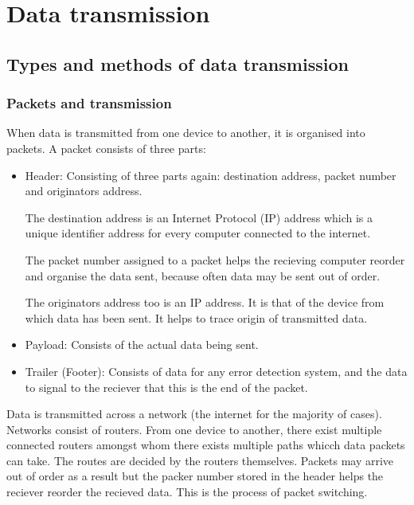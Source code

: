 \documentclass{article}
\begin{document}
\section{Data transmission}
\subsection{Types and methods of data transmission}
\subsubsection{Packets and transmission}
When data is transmitted from one device to another, it is organised into packets. A 
packet consists of three parts:
\begin{itemize}
	\item Header: Consisting of three parts again: destination address, packet number and
		originators address. 

		The destination address is an Internet Protocol (IP) address
		which is a unique identifier address for every computer connected to the internet.
		
		The packet number assigned to a packet helps the recieving computer reorder and
		organise the data sent, because often data may be sent out of order.

		The originators address too is an IP address. It is that of the device from which
		data has been sent. It helps to trace origin of transmitted data.
	\item Payload: Consists of the actual data being sent.
	\item Trailer (Footer): Consists of data for any error detection system, and the 
		data to signal to the reciever that this is the end of the packet.
\end{itemize}

Data is transmitted across a network (the internet for the majority of cases). Networks
consist of routers. From one device to another, there exist multiple connected routers
amongst whom there exists multiple paths whicch data packets can take. The routes are
decided by the routers themselves. Packets may arrive out of order as a result but the
packer number stored in the header helps the reciever reorder the recieved data. This is
the process of packet switching.
\end{document}
